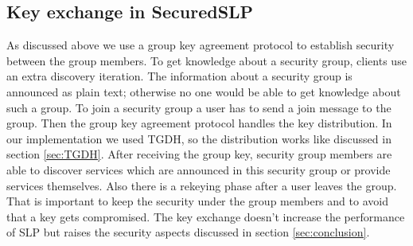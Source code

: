 \subsection{Key exchange in SecuredSLP}\label{sec:keyexchange}
As discussed above we use a group key agreement protocol to establish security between the group members. To get knowledge about a security group, clients use an extra discovery iteration. The information about a security group is announced as plain text; otherwise no one would be able to get knowledge about such a group. To join a security group a user has to send a join message to the group. Then the group key agreement protocol handles the key distribution. In our implementation we used TGDH, so the distribution works like discussed in section \ref{sec:TGDH}. After receiving the group key, security group members are able to discover services which are announced in this security group or provide services themselves. Also there is a rekeying phase after a user leaves the group. That is important to keep the security under the group members and to avoid that a key gets compromised. The key exchange doesn't increase the performance of SLP but raises the security aspects discussed in section \ref{sec:conclusion}.

